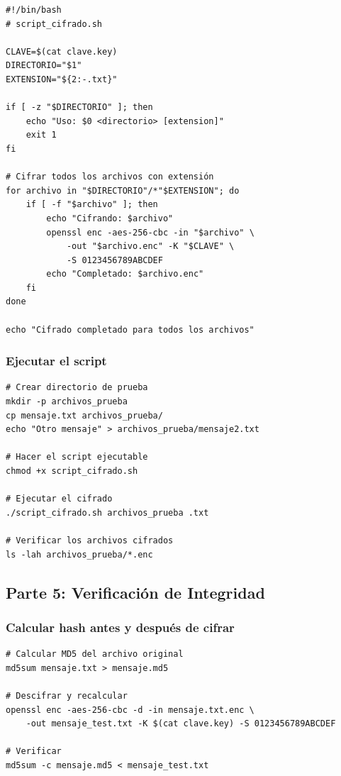 \documentclass[11pt,a4paper]{article}
\begin{document}
\begin{lstlisting}[caption={Script de cifrado por lotes}]
#!/bin/bash
# script_cifrado.sh

CLAVE=$(cat clave.key)
DIRECTORIO="$1"
EXTENSION="${2:-.txt}"

if [ -z "$DIRECTORIO" ]; then
    echo "Uso: $0 <directorio> [extension]"
    exit 1
fi

# Cifrar todos los archivos con extensión
for archivo in "$DIRECTORIO"/*"$EXTENSION"; do
    if [ -f "$archivo" ]; then
        echo "Cifrando: $archivo"
        openssl enc -aes-256-cbc -in "$archivo" \
            -out "$archivo.enc" -K "$CLAVE" \
            -S 0123456789ABCDEF
        echo "Completado: $archivo.enc"
    fi
done

echo "Cifrado completado para todos los archivos"
\end{lstlisting}

\subsubsection{Ejecutar el script}

\begin{lstlisting}[caption={Ejecución del script de cifrado}]
# Crear directorio de prueba
mkdir -p archivos_prueba
cp mensaje.txt archivos_prueba/
echo "Otro mensaje" > archivos_prueba/mensaje2.txt

# Hacer el script ejecutable
chmod +x script_cifrado.sh

# Ejecutar el cifrado
./script_cifrado.sh archivos_prueba .txt

# Verificar los archivos cifrados
ls -lah archivos_prueba/*.enc
\end{lstlisting}

\subsection{Parte 5: Verificación de Integridad}

\subsubsection{Calcular hash antes y después de cifrar}

\begin{lstlisting}[caption={Verificación de integridad}]
# Calcular MD5 del archivo original
md5sum mensaje.txt > mensaje.md5

# Descifrar y recalcular
openssl enc -aes-256-cbc -d -in mensaje.txt.enc \
    -out mensaje_test.txt -K $(cat clave.key) -S 0123456789ABCDEF

# Verificar
md5sum -c mensaje.md5 < mensaje_test.txt
\end{lstlisting}
\end{document}
